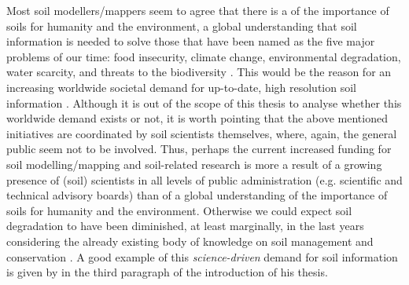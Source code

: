 Most soil modellers/mappers seem to agree that there is a  of the importance 
of soils for humanity and the environment, a global understanding that soil information is needed to solve 
those that have been named as the five major problems of our time: food insecurity, climate change, 
environmental degradation, water scarcity, and threats to the biodiversity \cite{SanchezEtAl2009}. 
This  would be the reason for an increasing worldwide societal demand for 
up-to-date, high resolution soil information \cite{OmutoEtAl2013}. Although it is out of the scope 
of this thesis to analyse whether this worldwide demand exists or not, it is worth pointing that the above 
mentioned initiatives are coordinated by soil scientists themselves, where, again, the general 
public seem not to be involved. Thus, perhaps the current increased funding for soil modelling/mapping and 
soil-related research is more a result of a growing presence of (soil) scientists in all levels of 
public administration (e.g. scientific and technical advisory boards) than of a global understanding
of the importance of soils for humanity and the environment. Otherwise we could expect soil 
degradation to have been diminished, at least marginally, in the last years considering the already 
existing body of knowledge on soil management and conservation \cite{Blanco-CanquiEtAl2010}. A good
example of this \emph{science-driven} demand for soil information is given by \citet{Kempen2011} in the 
third paragraph of the introduction of his thesis.

